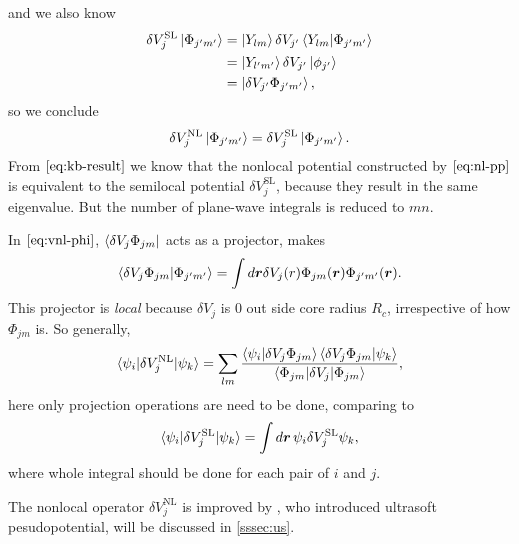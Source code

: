 and we also know
\begin{equation}
	\begin{split}
		\delta V_{j}^\text{SL} \ket{ \Phi_{j'm'} }
		&= \ket{Y_{lm}} \delta V_{j'} \braket{Y_{lm} | \Phi_{j'm'} } \\
		&= \ket{Y_{l'm'}} \delta V_{j'} \ket{\phi_{j'}} \\
		&= \ket{ \delta V_{j'} \Phi_{j'm'} },
	\end{split}
\end{equation}
so we conclude
\begin{equation}\label{eq:kb-result}
	\delta V_j^\text{NL} \ket{\Phi_{j'm'}} = \delta V_{j}^\text{SL} \ket{ \Phi_{j'm'} }.
\end{equation}
From $\eqref{eq:kb-result}$ we know that the nonlocal potential constructed by
$\eqref{eq:nl-pp}$ is equivalent to the semilocal potential $\delta V_{j}^\text{SL}$,
because they result in the same eigenvalue. But the number of
plane-wave integrals is reduced to $mn$.

In $\eqref{eq:vnl-phi}$, $\bra{\delta V_j \Phi_{jm}}$ acts as a projector,\cite{martin2004electronic} makes
\begin{equation}
	\braket{\delta V_j \Phi_{jm} | \Phi_{j'm'} } = \int d\bm{r} \delta V_j (r)
	\Phi_{jm} (\bm{r}) \Phi_{j'm'} (\bm{r}).
\end{equation}
This projector
is \emph{local} because $\delta V_j$ is $0$ out side core radius $R_c$, 
irrespective of how $\Phi_{jm}$ is.
So generally,\cite{martin2004electronic}
\begin{equation}
  \braket{ \psi_i | \delta V_j^\text{NL} | \psi_k }
  = \sum_{lm} 
  \frac{ \braket{\psi_i | \delta V_j \Phi_{jm}}  
    \braket{\delta V_j \Phi_{jm}  | \psi_k } }{
    \braket{ \Phi_{jm} | \delta V_j | \Phi_{jm} } },
\end{equation}
here only projection operations are need to be done,
comparing to
\begin{equation}
  \braket{ \psi_i | \delta V_j^\text{SL} | \psi_k }
  = \int d\bm{r} \, \psi_i \delta V_j^\text{SL} \psi_k,
\end{equation}
where whole integral should be done for each pair of $i$ and $j$.

The nonlocal operator $\delta V_j^\text{NL}$ is improved
by \citeauthor{Vanderbilt:1990is}, who introduced ultrasoft pesudopotential, will be discussed in \ref{sssec:us}.